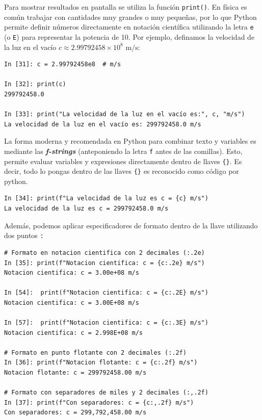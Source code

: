 \documentclass[12pt]{article}
\begin{document}
Para mostrar resultados en pantalla se utiliza la función \texttt{print()}. 
En física es común trabajar con cantidades muy grandes o muy pequeñas, por lo que Python 
permite definir números directamente en notación científica utilizando la letra \texttt{e} 
(o \texttt{E}) para representar la potencia de 10. Por ejemplo, definamos la velocidad de la luz en 
el vacío $c \approx 2.99792458 \times 10^8 \text{ m/s}$:

\begin{lstlisting}
In [31]: c = 2.99792458e8  # m/s

In [32]: print(c)
299792458.0

In [33]: print("La velocidad de la luz en el vacío es:", c, "m/s")
La velocidad de la luz en el vacío es: 299792458.0 m/s
\end{lstlisting}

La forma moderna y recomendada en Python para combinar texto y variables es 
mediante las \textbf{\textit{f-strings}} (anteponiendo la letra \texttt{f} antes de las comillas).
Esto, permite evaluar variables y expresiones directamente dentro de llaves \texttt{\{\}}. Es decir,
todo lo pongas dentro de las llaves \texttt{\{\}} es reconocido como código por python.

\begin{lstlisting}
In [34]: print(f"La velocidad de la luz es c = {c} m/s")
La velocidad de la luz es c = 299792458.0 m/s
\end{lstlisting}

Además, podemos aplicar especificadores de formato dentro de la llave utilizando dos puntos \texttt{:}

\begin{lstlisting}
# Formato en notacion cientifica con 2 decimales (:.2e)
In [35]: print(f"Notacion cientifica: c = {c:.2e} m/s")
Notacion cientifica: c = 3.00e+08 m/s

In [54]:  print(f"Notacion cientifica: c = {c:.2E} m/s")
Notacion cientifica: c = 3.00E+08 m/s

In [57]:  print(f"Notacion cientifica: c = {c:.3E} m/s")
Notacion cientifica: c = 2.998E+08 m/s

# Formato en punto flotante con 2 decimales (:.2f)
In [36]: print(f"Notacion flotante: c = {c:.2f} m/s")
Notacion flotante: c = 299792458.00 m/s

# Formato con separadores de miles y 2 decimales (:,.2f)
In [37]: print(f"Con separadores: c = {c:,.2f} m/s")
Con separadores: c = 299,792,458.00 m/s
\end{lstlisting}
\end{document}
